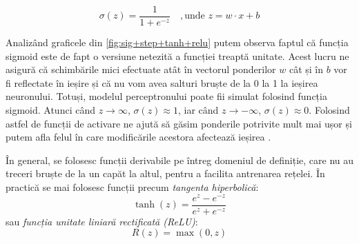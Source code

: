 \begin{equation}
\sigma(z) = \frac{1}{1+e^{-z}} \quad,\text{unde }z= w\cdot x + b
\label{eq:sigm}
\end{equation}

Analizând graficele din \autoref{fig:sig+step+tanh+relu} putem observa faptul că funcția sigmoid este de fapt o versiune netezită a funcției treaptă unitate. Acest lucru ne asigură că schimbările mici efectuate atât în vectorul ponderilor $w$ cât și în $b$ vor fi reflectate în ieșire și că nu vom avea salturi bruște de la 0 la 1 la ieșirea neuronului.
Totuși, modelul perceptronului poate fii simulat folosind funcția sigmoid. Atunci când $z\rightarrow\infty$, $\sigma(z)\approx 1$, iar când $z\rightarrow-\infty$, $\sigma(z)\approx 0$. Folosind astfel de funcții de activare ne ajută să găsim ponderile potrivite mult mai ușor și putem afla felul în care modificările acestora afectează ieșirea \cite{neuralnetbook:2015}.

În general, se folosesc funcții derivabile pe întreg domeniul de definiție, care nu au treceri bruște de la un capăt la altul, pentru a facilita antrenarea rețelei. În practică se mai folosesc funcții precum \textit{tangenta hiperbolică}:
\begin{equation}
\tanh(z)=\frac{e^z - e^{-z}}{e^z + e^{-z}}
\end{equation}
sau \textit{funcția unitate liniară rectificată (ReLU)}:
\begin{equation}
R(z)=\max(0,z)
\label{eq:relu}
\end{equation}


